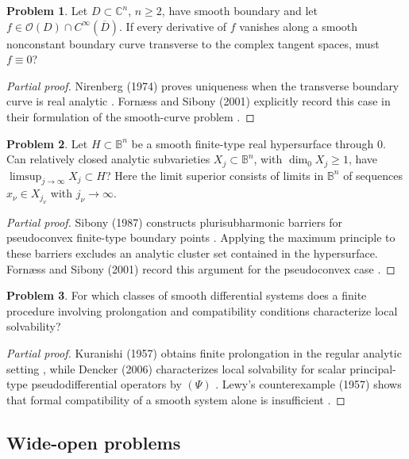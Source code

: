 \documentclass[11pt,reqno]{amsart}
\theoremstyle{definition}
\newtheorem{problem}{Problem}[section]
\theoremstyle{remark}
\begin{document}
\begin{problem}\label{FS-3.15}
Let $D\subset\mathbb C^n$, $n\geq2$, have smooth boundary and let $f\in\mathcal O(D)\cap C^\infty(\overline D)$. If every derivative of $f$ vanishes along a smooth nonconstant boundary curve transverse to the complex tangent spaces, must $f\equiv0$?
\end{problem}
\begin{proof}[Partial proof]
Nirenberg (1974) proves uniqueness when the transverse boundary curve is real analytic \cite{FS-Nirenberg}. Forn\ae ss and Sibony (2001) explicitly record this case in their formulation of the smooth-curve problem \cite[Question~3.15]{FS2001}.
\end{proof}

\begin{problem}\label{FS-3.24}
Let $H\subset\mathbb B^n$ be a smooth finite-type real hypersurface through $0$. Can relatively closed analytic subvarieties $X_j\subset\mathbb B^n$, with $\dim_0X_j\geq1$, have $\limsup_{j\to\infty}X_j\subset H$? Here the limit superior consists of limits in $\mathbb B^n$ of sequences $x_\nu\in X_{j_\nu}$ with $j_\nu\to\infty$.
\end{problem}
\begin{proof}[Partial proof]
Sibony (1987) constructs plurisubharmonic barriers for pseudoconvex finite-type boundary points \cite{FS-SibonyBarrier}. Applying the maximum principle to these barriers excludes an analytic cluster set contained in the hypersurface. Forn\ae ss and Sibony (2001) record this argument for the pseudoconvex case \cite[Question~3.24]{FS2001}.
\end{proof}

\begin{problem}\label{Siu-2.10}
For which classes of smooth differential systems does a finite procedure involving prolongation and compatibility conditions characterize local solvability?
\end{problem}
\begin{proof}[Partial proof]
Kuranishi (1957) obtains finite prolongation in the regular analytic setting \cite{SIU-Kur57}, while Dencker (2006) characterizes local solvability for scalar principal-type pseudodifferential operators by $(\Psi)$ \cite{SIU-Den06}. Lewy's counterexample (1957) shows that formal compatibility of a smooth system alone is insufficient \cite{SIU-Lew57}.
\end{proof}

\subsection{Wide-open problems}
\end{document}
